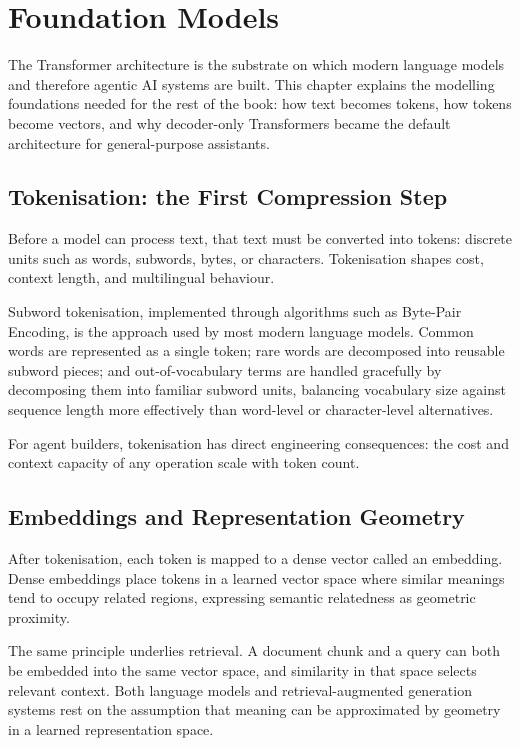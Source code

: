 \chapter{Foundation Models}

The Transformer architecture is the substrate on which modern language models and
therefore agentic AI systems are built. This chapter explains the modelling foundations
needed for the rest of the book: how text becomes tokens, how tokens become vectors, and
why decoder-only Transformers became the default architecture for general-purpose
assistants.

\section{Tokenisation: the First Compression Step}

Before a model can process text, that text must be converted into tokens: discrete units
such as words, subwords, bytes, or characters. Tokenisation shapes cost, context length,
and multilingual behaviour.

Subword tokenisation, implemented through algorithms such as Byte-Pair Encoding, is the
approach used by most modern language models. Common words are represented as a single
token; rare words are decomposed into reusable subword pieces; and out-of-vocabulary
terms are handled gracefully by decomposing them into familiar subword units, balancing
vocabulary size against sequence length more effectively than word-level or
character-level alternatives.

For agent builders, tokenisation has direct engineering consequences: the cost and
context capacity of any operation scale with token count.

\section{Embeddings and Representation Geometry}

After tokenisation, each token is mapped to a dense vector called an embedding. Dense
embeddings place tokens in a learned vector space where similar meanings tend to occupy related regions, expressing semantic relatedness
as geometric proximity.

The same principle underlies retrieval. A document chunk and a query can both be
embedded into the same vector space, and similarity in that space selects relevant
context. Both language models and retrieval-augmented generation systems rest on the
assumption that meaning can be approximated by geometry in a learned representation
space.

